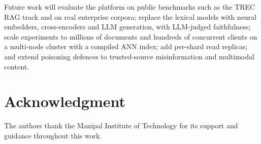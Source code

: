 \documentclass[journal]{IEEEtran}
\begin{document}
Future work will evaluate the platform on public benchmarks such as the TREC RAG track and on real
enterprise corpora; replace the lexical models with neural embedders, cross-encoders and LLM generation,
with LLM-judged faithfulness; scale experiments to millions of documents and hundreds of concurrent
clients on a multi-node cluster with a compiled ANN index; add per-shard read replicas; and extend
poisoning defences to trusted-source misinformation and multimodal content.

\section*{Acknowledgment}
The authors thank the Manipal Institute of Technology for its support and guidance throughout this work.



\end{document}
